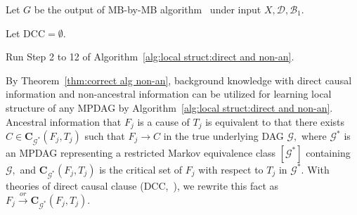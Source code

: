 \documentclass{article}
\begin{document}
\begin{algorithm}[t]
\LinesNumbered
\caption{Learning the local structure around $X$ given background knowledge consisting of direct causal information $\mathcal{B}_1$, non-ancestral information $\mathcal{B}_2$ and ancestral information $\mathcal{B}_3$.}
\label{alg:local struct:all types}
\small

Let $G$ be the output of MB-by-MB algorithm~\citep{wang2014discovering} under input $X,\mathcal{D},\mathcal{B}_1$.

Let $\mathrm{DCC}=\emptyset$.



Run Step 2 to 12 of Algorithm~\ref{alg:local struct:direct and non-an}.


\end{algorithm}

By Theorem~\ref{thm:correct alg non-an}, background knowledge with direct causal information and non-ancestral information can be utilized for learning local structure of any MPDAG by Algorithm~\ref{alg:local struct:direct and non-an}. Ancestral information that $F_j$ is a cause of $T_j$ is equivalent to that there exists $C\in \mathbf{C}_{\mathcal{G}^*}(F_j,T_j)$ such that $F_j\to C$ in the true underlying DAG $\mathcal{G},$ where $\mathcal{G}^*$ is an MPDAG representing a restricted Markov equivalence class $[\mathcal{G}^*]$ containing $\mathcal{G},$ and $\mathbf{C}_{\mathcal{G}^*}(F_j,T_j)$ is the critical set of $F_j$ with respect to $T_j$ in $\mathcal{G}^*.$ With theories of direct causal clause (DCC,~\citep{fang2022representation}), we rewrite this fact as $F_j\overset{or}{\to} \mathbf{C}_{\mathcal{G}^*}(F_j,T_j).$
\end{document}

